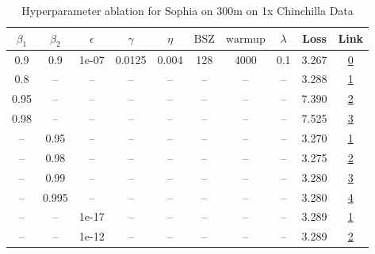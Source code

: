 \begin{table}[H]
\centering
\caption{Hyperparameter ablation for Sophia on 300m on 1x Chinchilla Data}
\label{tab:ablation_sophia_300m_on_1x_chinchilla_data}
\begin{tabular}{cccccccccc}
\toprule
$\beta_1$ & $\beta_2$ & $\epsilon$ & $\gamma$ & $\eta$ & $\mathrm{BSZ}$ & $\mathrm{warmup}$ & $\lambda$ & Loss & Link \\
\midrule
0.9 & 0.9 & 1e-07 & 0.0125 & 0.004 & 128 & 4000 & 0.1 & 3.267 & \href{https://wandb.ai/stanford-mercury/optimizer-scaling/runs/sweep-300m-6B-sophiafff382flr0.004-wd0.1-minlr0-warmup4000-b10.9-f1648d}{0} \\
\midrule
0.8 & -- & -- & -- & -- & -- & -- & -- & 3.288 & \href{https://wandb.ai/stanford-mercury/optimizer-scaling/runs/sweep-300m-6B-sophiaf8a1eb4lr0.004-wd0.1-minlr0-warmup4000-b10.8-b88dc2}{1} \\
0.95 & -- & -- & -- & -- & -- & -- & -- & 7.390 & \href{https://wandb.ai/stanford-mercury/optimizer-scaling/runs/sweep-300m-6B-sophia727e1alr0.004-wd0.1-minlr0-warmup4000-b10.95-6fbf63}{2} \\
0.98 & -- & -- & -- & -- & -- & -- & -- & 7.525 & \href{https://wandb.ai/stanford-mercury/optimizer-scaling/runs/sweep-300m-6B-sophiaf5a4caalr0.004-wd0.1-minlr0-warmup4000-b10.9-3b3a58}{3} \\
-- & 0.95 & -- & -- & -- & -- & -- & -- & 3.270 & \href{https://wandb.ai/stanford-mercury/optimizer-scaling/runs/sweep-300m-6B-sophiaf5093aclr0.004-wd0.1-minlr0-warmup4000-b10.9-f76ba7}{1} \\
-- & 0.98 & -- & -- & -- & -- & -- & -- & 3.275 & \href{https://wandb.ai/stanford-mercury/optimizer-scaling/runs/sweep-300m-6B-sophiaqd032adlr0.004-wd0.1-minlr0-warmup4000-b10.9-2f3128}{2} \\
-- & 0.99 & -- & -- & -- & -- & -- & -- & 3.280 & \href{https://wandb.ai/stanford-mercury/optimizer-scaling/runs/sweep-300m-6B-sophiaff4bc42lr0.004-wd0.1-minlr0-warmup4000-b10.9-3cffe0}{3} \\
-- & 0.995 & -- & -- & -- & -- & -- & -- & 3.280 & \href{https://wandb.ai/stanford-mercury/optimizer-scaling/runs/sweep-300m-6B-sophiaf602b10lr0.004-wd0.1-minlr0-warmup4000-b10.9-9d3420}{4} \\
-- & -- & 1e-17 & -- & -- & -- & -- & -- & 3.289 & \href{https://wandb.ai/stanford-mercury/optimizer-scaling/runs/sweep-300m-6B-sophia145319lr0.004-wd0.1-minlr0-warmup4000-b10.9--aa98b0}{1} \\
-- & -- & 1e-12 & -- & -- & -- & -- & -- & 3.289 & \href{https://wandb.ai/stanford-mercury/optimizer-scaling/runs/sweep-300m-6B-sophiaf6afd56lr0.004-wd0.1-minlr0-warmup4000-b10.9-c96ddc}{2} \\

\end{tabular}
\end{table}
